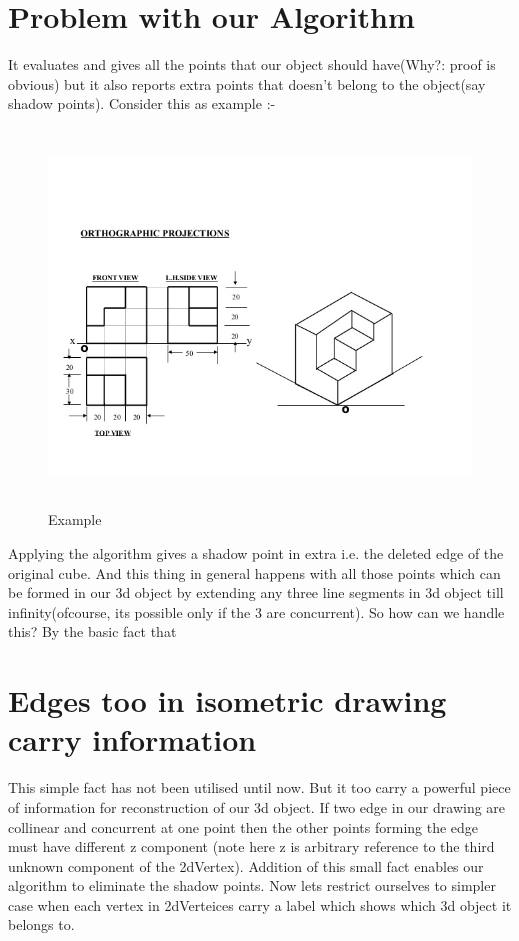 \documentclass{article}
\begin{document}
\section{Problem with our Algorithm}
It evaluates and gives all the points that our object should have(Why?: proof is obvious) but it also reports extra points that doesn’t belong to the object(say shadow points). Consider this as example :-

\begin{figure}[H]
  \includegraphics[width=15cm,height=10cm]{unit-6-isometric-views-28-638.png}
  \caption{Example}
  \label{fig:boa}
\end{figure}

Applying the algorithm gives a shadow point in extra i.e. the deleted edge of the original cube.
And this thing in general happens with all those points which can be formed in our 3d object by extending any three line segments in 3d object till infinity(ofcourse, its possible only if the 3 are concurrent).  So how can we handle this? By the basic fact that

\section{Edges too in isometric drawing carry information}
This simple fact has not been utilised until now. But it too carry a powerful piece of information for reconstruction of our 3d object. If two edge in our drawing are collinear and concurrent at one point then the other points forming the edge must have different z component (note here z is arbitrary reference to the third unknown component of the 2dVertex). 
Addition of this small fact enables our algorithm to eliminate the shadow points. 
Now lets restrict ourselves to simpler case when each vertex in 2dVerteices carry a label which shows which 3d object it belongs to.
\end{document}
